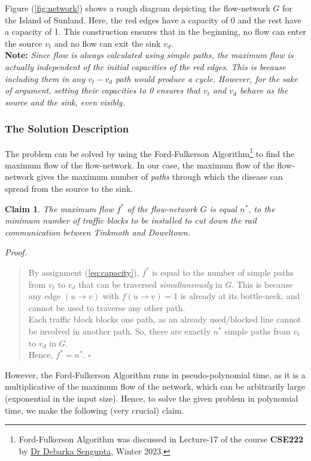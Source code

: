 \documentclass[12pt]{report}
\newtheorem{claim}{Claim}
\begin{document}
    \vspace*{10pt} \linebreak
    Figure (\ref{fig:network}) shows a rough diagram depicting the flow-network $G$ for the Island of Sunland.
    Here, the red edges have a capacity of 0 and the rest have a capacity of 1.
    This construction ensures that in the beginning, no flow can enter the source $v_{t}$ and no flow can exit the sink $v_{d}$.
    \vspace*{10pt} \\
    \textbf{Note:} \textit{Since flow is always calculated using simple paths, the maximum flow is actually independent of the initial capacities of the red edges.
    This is because including them in any $v_{t}-v_{d}$ path would produce a cycle.
    However, for the sake of argument, setting their capacities to 0 ensures that $v_{t}$ and $v_{d}$ behave as the source and the sink, even visibly.}

    \subsubsection*{The Solution Description}
    The problem can be solved by using the Ford-Fulkerson Algorithm\footnote{
        Ford-Fulkerson Algorithm was discussed in Lecture-17 of the course \textbf{CSE222} by \href{mailto:debarka@iiitd.ac.in}{Dr Debarka Sengupta},
        Winter 2023.
    } to find the maximum flow of the flow-network.
    In our case, the maximum flow of the flow-network gives the maximum
    number of \textit{paths} through which the disease can spread from the source to the sink.

    \begin{claim}
        \label{claim:max-flow-min-cut}
        The maximum flow $f^{*}$ of the flow-network $G$ is equal $n^{*}$, to the minimum number of traffic blocks to be installed to cut down the
        rail communication between Tinkmoth and Doweltown.
    \end{claim}
    \textit{Proof.}
    \begin{quote}
        By assignment (\ref{eq:capacity}), $f^{*}$ is equal to the number of simple paths from $v_{t}$ to $v_{d}$ that can be traversed \textit{simultaneously} in $G$.
        This is because any edge $(u \to v)$ with $f(u \to v) = 1$ is already at its bottle-neck, and cannot be used to traverse any other path. \\
        Each traffic block blocks one path, as an already used/blocked line cannot be involved in another path. So, there are exactly $n^{*}$ simple
        paths from $v_{t}$ to $v_{d}$ in $G$. \\
        Hence, $f^{*} = n^{*}$. \hfill $\square$
    \end{quote}
    However, the Ford-Fulkerson Algorithm runs in pseudo-polynomial time, as it is a multiplicative of the maximum flow of the network,
    which can be arbitrarily large (exponential in the input size).
    Hence, to solve the given problem in polynomial time, we make the following (very crucial) claim.
\end{document}
